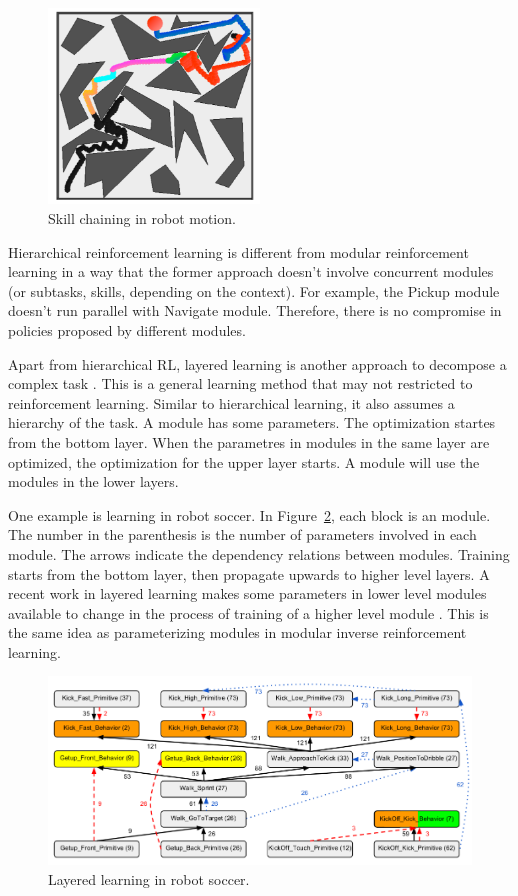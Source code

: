 \begin{figure}[h]
\centering
\includegraphics[width=0.5\textwidth]{skills}
\caption{Skill chaining in robot motion.}
\label{fig:skills}
\end{figure}

Hierarchical reinforcement learning is different from modular reinforcement
learning in a way that the former approach doesn't involve concurrent modules
(or subtasks, skills, depending on the context).
For example, the Pickup module doesn't run parallel with Navigate module.
Therefore, there is no compromise in policies proposed by different modules.

Apart from hierarchical RL, layered learning is another approach to decompose a
complex task \cite{stone2000layered}. This is a general learning method that may
not restricted to reinforcement learning. Similar to hierarchical learning, it
also assumes a hierarchy of the task. A module has some parameters. The
optimization startes from the bottom layer. When the parametres in modules in
the same layer are optimized, the optimization for the upper layer starts. A
module will use the modules in the lower layers.

One example is learning in robot soccer. In Figure~\ref{fig:soccer}, each block
is an module. The number in the parenthesis is the number of parameters involved
in each module. The arrows indicate the dependency relations between modules.
Training starts from the bottom layer, then propagate upwards to higher level
layers.
A recent work in layered learning makes some parameters in lower level modules
available to change in the process of training of a higher level module
\cite{macalpine2015ut}. This is the same idea as parameterizing modules in
modular inverse reinforcement learning. 

\begin{figure}[h]
\centering
\includegraphics[width=\textwidth]{layered}
\caption{Layered learning in robot soccer. \cite{macalpine2015ut}}
\label{fig:soccer}
\end{figure}

